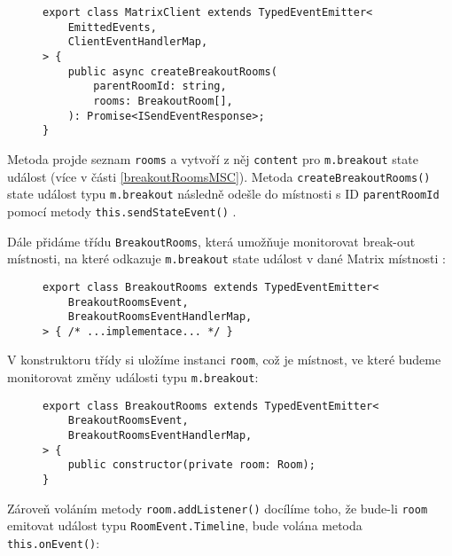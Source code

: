 \begin{figure}[H]
    \begin{verbatim}
export class MatrixClient extends TypedEventEmitter<
	EmittedEvents,
	ClientEventHandlerMap,
> {
	public async createBreakoutRooms(
		parentRoomId: string,
		rooms: BreakoutRoom[],
	): Promise<ISendEventResponse>;
}
	\end{verbatim}
\end{figure}

Metoda projde seznam \texttt{rooms} a vytvoří z něj
\texttt{content} pro \texttt{m.breakout} state událost (více
v části \ref{breakoutRoomsMSC}). Metoda
\texttt{createBreakoutRooms()} state událost typu
\texttt{m.breakout} následně odešle do místnosti s ID
\texttt{parentRoomId} pomocí metody
\texttt{this.sendStateEvent()}
\parencite{GitHub-MatrixJSSDK-BreakoutRooms}.

Dále přidáme třídu \texttt{BreakoutRooms}, která umožňuje
monitorovat break-out místnosti, na které odkazuje \texttt{m.breakout}
state událost v dané Matrix místnosti
\parencite{GitHub-MatrixJSSDK-BreakoutRooms}:

\begin{figure}[H]
    \begin{verbatim}
export class BreakoutRooms extends TypedEventEmitter<
	BreakoutRoomsEvent,
	BreakoutRoomsEventHandlerMap,
> { /* ...implementace... */ }
	\end{verbatim}
\end{figure}

V konstruktoru třídy si uložíme instanci \texttt{room}, což je
místnost, ve které budeme monitorovat změny události typu
\texttt{m.breakout}:

\begin{figure}[H]
    \begin{verbatim}
export class BreakoutRooms extends TypedEventEmitter<
	BreakoutRoomsEvent,
	BreakoutRoomsEventHandlerMap,
> {
	public constructor(private room: Room);
}
	\end{verbatim}
\end{figure}

Zároveň voláním metody \texttt{room.addListener()} docílíme
toho, že bude-li \texttt{room} emitovat událost typu
\texttt{RoomEvent.Timeline}, bude volána metoda
\texttt{this.onEvent()}:

